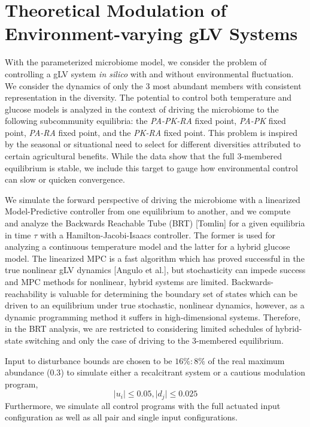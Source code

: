 \documentclass[twocolumn, 10pt]{report}
\begin{document}
{\section*{Theoretical Modulation of Environment-varying gLV Systems}

\indent \indent With the parameterized microbiome model, we consider the problem of controlling a gLV system \textit{in silico} with and without environmental fluctuation. We consider the dynamics of only the $3$ most abundant members with consistent representation in the diversity. The potential to control both temperature and glucose models is analyzed in the context of driving the microbiome to the following subcommunity equilibria: the \textit{PA-PK-RA} fixed point, \textit{PA-PK} fixed point, \textit{PA-RA} fixed point, and the \textit{PK-RA} fixed point. This problem is inspired by the seasonal or situational need to select for different diversities attributed to certain agricultural benefits. While the data show that the full 3-membered equilibrium is stable, we include this target to gauge how environmental control can slow or quicken convergence.

We simulate the forward perspective of driving the microbiome with a linearized Model-Predictive controller from one equilibrium to another, and we compute and analyze the Backwards Reachable Tube (BRT) [Tomlin] for a given equilibria in time $\tau$ with a Hamilton-Jacobi-Isaacs controller. The former is used for analyzing a continuous temperature model and the latter for a hybrid glucose model. The linearized MPC is a fast algorithm which has proved successful in the true nonlinear gLV dynamics [Angulo et al.], but stochasticity can impede success and MPC methods for nonlinear, hybrid systems are limited. Backwards-reachability is valuable for determining the boundary set of states which can be driven to an equilibrium under true stochastic, nonlinear dynamics, however, as a dynamic programming method it suffers in high-dimensional systems. Therefore, in the BRT analysis, we are restricted to considering limited schedules of hybrid-state switching and only the case of driving to the 3-membered equilibrium.

Input to disturbance bounds are chosen to be $16\%:8\%$ of the real maximum abundance ($0.3$) to simulate either a recalcitrant system or a cautious modulation program,
\begin{equation}\label{u_d_bounds}
    \lvert u_i \rvert \leq 0.05, \lvert d_j \rvert \leq 0.025
\end{equation}
Furthermore, we simulate all control programs with the full actuated input configuration as well as all pair and single input configurations.

}
\end{document}
